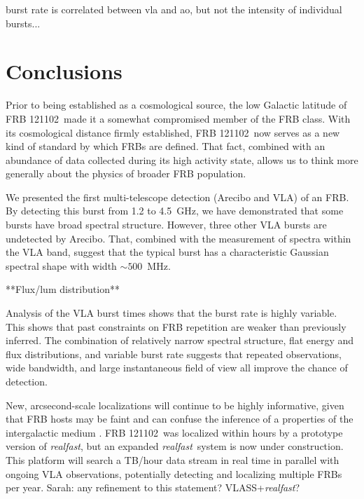 \documentclass[twocolumn]{aastex61}
\newcommand{\rf}{\emph{realfast}}
\newcommand{\frb}{FRB 121102}
\begin{document}
burst rate is correlated between vla and ao, but not the intensity of individual bursts...


\section{Conclusions}
Prior to being established as a cosmological source, the low Galactic latitude of \frb\ made it a somewhat compromised member of the FRB class. With its cosmological distance firmly established, \frb\ now serves as a new kind of standard by which FRBs are defined. That fact, combined with an abundance of data collected during its high activity state, allows us to think more generally about the physics of broader FRB population.

We presented the first multi-telescope detection (Arecibo and VLA) of an FRB. By detecting this burst from 1.2 to 4.5~GHz, we have demonstrated that some bursts have broad spectral structure. However, three other VLA bursts are undetected by Arecibo. That, combined with the measurement of spectra within the VLA band, suggest that the typical burst has a characteristic Gaussian spectral shape with width $\sim500$\ MHz.

**Flux/lum distribution**

Analysis of the VLA burst times shows that the burst rate is highly variable. This shows that past constraints on FRB repetition are weaker than previously inferred. The combination of relatively narrow spectral structure, flat energy and flux distributions, and variable burst rate suggests that repeated observations, wide bandwidth, and large instantaneous field of view all improve the chance of detection. 

New, arcsecond-scale localizations will continue to be highly informative, given that FRB hosts may be faint and can confuse the inference of a properties of the intergalactic medium \citep{2014ApJ...783L..35D}. \frb\ was localized within hours by a prototype version of \rf, but an expanded \rf\ system is now under construction. This platform will search a TB/hour data stream in real time in parallel with ongoing VLA observations, potentially detecting and localizing multiple FRBs per year. {\color{red} Sarah: any refinement to this statement?} VLASS+\rf?
\end{document}

